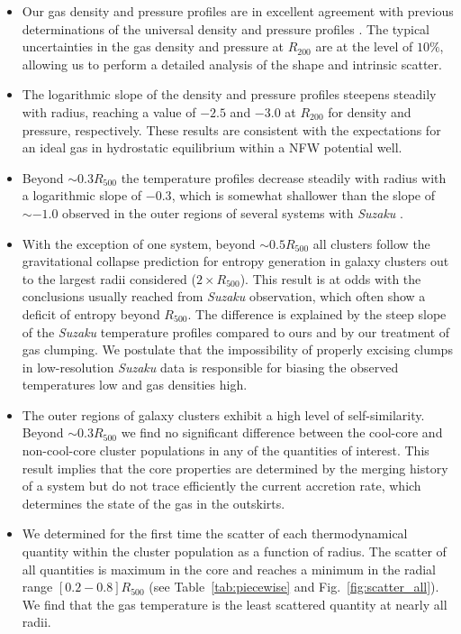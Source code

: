 \documentclass[traditabstract   ]{aa} %
\begin{document}
\begin{itemize}
\item  Our gas density and pressure profiles are in excellent agreement with previous determinations of the universal density \citep{eckert12} and pressure profiles \citep{planck+13}. The typical uncertainties in the gas density and pressure at $R_{200}$ are at the level of $10\%$, allowing us to perform a detailed analysis of the shape and intrinsic scatter.
\item The logarithmic slope of the density and pressure profiles steepens steadily with radius, reaching a value of $-2.5$ and $-3.0$ at $R_{200}$ for density and pressure, respectively. These results are consistent with the expectations for an ideal gas in hydrostatic equilibrium within a NFW potential well.
\item Beyond $\sim0.3R_{500}$ the temperature profiles decrease steadily with radius with a logarithmic slope of $-0.3$, which is somewhat shallower than the slope of $\sim-1.0$ observed in the outer regions of several systems with \emph{Suzaku} \citep{reiprich13}. 
\item With the exception of one system, beyond $\sim0.5R_{500}$ all clusters follow the gravitational collapse prediction for entropy generation in galaxy clusters \citep{voit+05} out to the largest radii considered ($2\times R_{500}$). This result is at odds with the conclusions usually reached from \emph{Suzaku} observation, which often show a deficit of entropy beyond $R_{500}$. The difference is explained by the steep slope of the \emph{Suzaku} temperature profiles compared to ours and by our treatment of gas clumping. We postulate that the impossibility of properly excising clumps in low-resolution \emph{Suzaku} data is responsible for biasing the observed temperatures low and gas densities high.
\item The outer regions of galaxy clusters exhibit a high level of self-similarity. Beyond $\sim0.3R_{500}$ we find no significant difference between the cool-core and non-cool-core cluster populations in any of the quantities of interest. This result implies that the core properties are determined by the merging history of a system but do not trace efficiently the current accretion rate, which determines the state of the gas in the outskirts.
\item We determined for the first time the scatter of each thermodynamical quantity within the cluster population as a function of radius. The scatter of all quantities is maximum in the core and reaches a minimum in the radial range $[0.2-0.8]R_{500}$ (see Table~\ref{tab:piecewise} and Fig.~\ref{fig:scatter_all}). We find that the gas temperature is the least scattered quantity at nearly all radii. 
\end{itemize}
\end{document}
